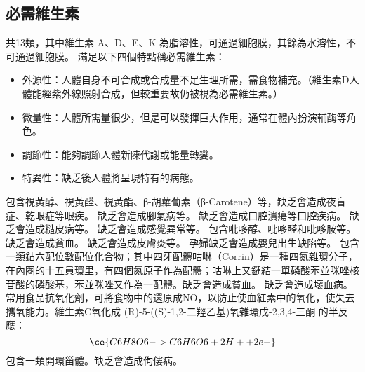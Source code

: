 \documentclass[a4paper,12pt]{report}
\begin{document}
\begin{itemize}
\begin{itemize}
\subsection{必需維生素}
共13類，其中維生素 A、D、E、K 為脂溶性，可通過細胞膜，其餘為水溶性，不可通過細胞膜。
滿足以下四個特點稱必需維生素：
\begin{itemize}
\item 外源性：人體自身不可合成或合成量不足生理所需，需食物補充。（維生素D人體能經紫外線照射合成，但較重要故仍被視為必需維生素。）
\item 微量性：人體所需量很少，但是可以發揮巨大作用，通常在體內扮演輔酶等角色。
\item 調節性：能夠調節人體新陳代謝或能量轉變。
\item 特異性：缺乏後人體將呈現特有的病態。
\end{itemize}
包含視黃醇、視黃醛、視黃酯、β-胡蘿蔔素（β-Carotene）等，缺乏會造成夜盲症、乾眼症等眼疾。
缺乏會造成腳氣病等。
缺乏會造成口腔潰瘍等口腔疾病。
缺乏會造成糙皮病等。
缺乏會造成感覺異常等。
包含吡哆醇、吡哆醛和吡哆胺等。缺乏會造成貧血。
缺乏會造成皮膚炎等。
孕婦缺乏會造成嬰兒出生缺陷等。
包含一類鈷六配位數配位化合物；其中四牙配體咕啉（Corrin）是一種四氮雜環分子，在內圈的十五員環里，有四個氮原子作為配體；咕啉上又鍵結一單磷酸苯並咪唑核苷酸的磷酸基，苯並咪唑又作為一配體。缺乏會造成貧血。
缺乏會造成壞血病。常用食品抗氧化劑，可將食物中的還原成NO，以防止使血紅素中的氧化，使失去攜氧能力。維生素C氧化成 (R)-5-((S)-1,2-二羥乙基)氧雜環戊-2,3,4-三酮 的半反應：
\[\ce{C6H8O6 -> C6H6O6 + 2H+ + 2e-}\]
包含一類開環甾體。缺乏會造成佝僂病。

\end{itemize}
\end{itemize}
\end{document}
